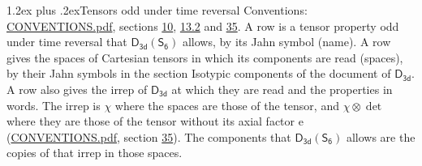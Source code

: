 \documentclass[10pt,a4paper]{article}
\makeatletter
\renewcommand\section{\@startsection{section}{1}{\z@}{-3ex plus -1ex minus -.2ex}%
  {1.2ex plus .2ex}{\normalfont\large\sffamily\bfseries\color{parttitle}}}
\numberwithin{equation}{section}
\newcommand{\grp}[1]{\mathsf{#1}}
\newcommand{\irrprod}{\otimes}
\makeatother
\begin{document}
\section{Tensors odd under time reversal}\label{s:time_odd}
Conventions: \href{../../CONVENTIONS.pdf}{CONVENTIONS.pdf}, sections \href{../../../rotation/CONVENTIONS.pdf\#conv.10}{10}, \href{../../../rotation/CONVENTIONS.pdf\#conv.13.2}{13.2} and \href{../../CONVENTIONS.pdf\#conv.35}{35}.
\leavevmode\label{n:head.name.property}A row is a tensor property odd under time reversal that $\grp{D_{3d}}(\grp{S_{6}})$ allows, by its Jahn symbol (name). \label{n:head.spaces}A row gives the spaces of Cartesian tensors in which its components are read (spaces), by their Jahn symbols in the section Isotypic components of the document of \href{../../../rotation/data/pdf/D3d.pdf}{$\grp{D_{3d}}$}. \label{n:head.properties}A row also gives the irrep of $\grp{D_{3d}}$ at which they are read and the properties in words. The irrep is $\chi$ where the spaces are those of the tensor, and $\chi \irrprod \det$ where they are those of the tensor without its axial factor e (\href{../../CONVENTIONS.pdf}{CONVENTIONS.pdf}, section \href{../../CONVENTIONS.pdf\#conv.35}{35}). The components that $\grp{D_{3d}}(\grp{S_{6}})$ allows are the copies of that irrep in those spaces.
\end{document}
